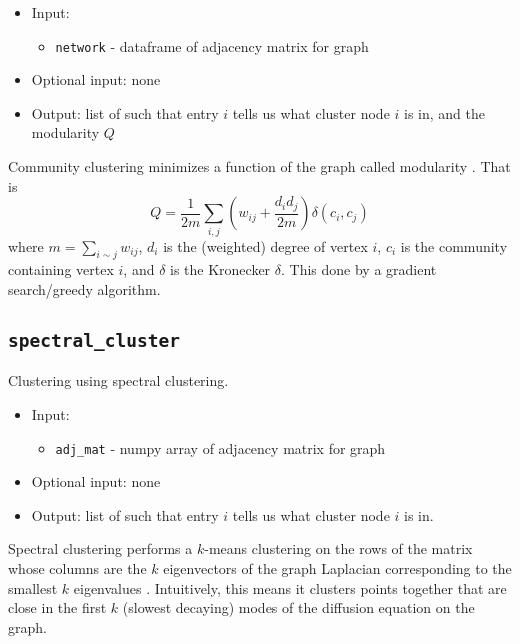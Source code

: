 \documentclass[10pt]{article}
\theoremstyle{definition}
\numberwithin{theorem}{section}
\numberwithin{definition}{section}
\numberwithin{lemma}{section}
\numberwithin{corollary}{section}
\numberwithin{clm}{section}
\numberwithin{rmk}{section}
\begin{document}
\begin{itemize}
	\item Input: 
	\begin{itemize}
		\item \verb|network| - dataframe of adjacency matrix for graph
	\end{itemize}
	\item Optional input: none
	\item Output:  list of such that entry $i$ tells us what cluster node $i$ is in, and the modularity $Q$
\end{itemize}

Community clustering minimizes a function of the graph called modularity \cite{PhysRevE.70.066111}\cite{PhysRevE.70.056131}. That is 
\[
Q = \frac{1}{2m}\sum_{i,j}\left(w_{ij} + \frac{d_id_j}{2m}\right) \delta(c_i,c_j)
\]
where $m = \sum_{i\sim j} w_{ij}$, $d_i$ is the (weighted) degree of vertex $i$, $c_i$ is the community containing vertex $i$, and $\delta$ is the Kronecker $\delta$. This done by a gradient search/greedy algorithm.

\cprotect \subsection{\verb|spectral_cluster|}
Clustering using spectral clustering.
\begin{itemize}
	\item Input: 
	\begin{itemize}
		\item \verb|adj_mat| - numpy array of adjacency matrix for graph
	\end{itemize}
	\item Optional input: none
	\item Output: list of such that entry $i$ tells us what cluster node $i$ is in.
\end{itemize}

Spectral clustering performs a $k$-means clustering on the rows of the matrix whose columns are the $k$ eigenvectors of the graph Laplacian corresponding to the smallest $k$ eigenvalues \cite{vonLuxburg2007} . Intuitively, this means it clusters points together that are close in the first $k$ (slowest decaying) modes of the diffusion equation on the graph. 
\end{document}
